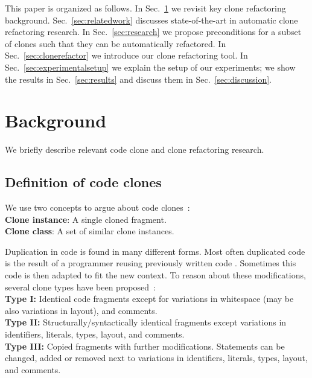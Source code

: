\documentclass[sigconf,review,anonymous]{acmart}
\begin{document}
This paper is organized as follows. In Sec.~\ref{sec:background} we revisit key clone refactoring background. Sec.~\ref{sec:relatedwork} discusses state-of-the-art in automatic clone refactoring research. In Sec.~\ref{sec:research} we propose preconditions for a subset of clones such that they can be automatically refactored. In Sec.~\ref{sec:clonerefactor} we introduce our clone refactoring tool. In Sec.~\ref{sec:experimentalsetup} we explain the setup of our experiments; we show the results in Sec.~\ref{sec:results} and discuss them in Sec.~\ref{sec:discussion}.

\section{Background}\label{sec:background}
We briefly describe relevant code clone and clone refactoring research.

\subsection{Definition of code clones}
We use two concepts to argue about code clones~\cite{roy2007survey}:
\\ \textbf{Clone instance}: A single cloned fragment.
\\ \textbf{Clone class}: A set of similar clone instances.

Duplication in code is found in many different forms. Most often duplicated code is the result of a programmer reusing previously written code \cite{haefliger2008code, baxter1998clone}. Sometimes this code is then adapted to fit the new context. To reason about these modifications, several clone types have been proposed~\cite{roy2007survey}:\\
\textbf{Type I:} Identical code fragments except for variations in whitespace (may be also variations in layout), and comments.\\
\textbf{Type II:} Structurally/syntactically identical fragments except variations in identifiers, literals, types, layout, and comments.\\
\textbf{Type III:} Copied fragments with further modifications. Statements can be changed, added or removed next to variations in identifiers, literals, types, layout, and comments.
\end{document}
